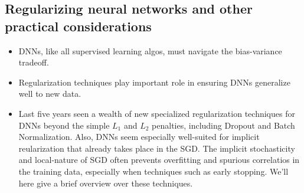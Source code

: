 \documentclass[norsk,a4paper,11pt]{article}
\begin{document}
\subsection{Regularizing neural networks and other practical considerations}
\begin{itemize}
	\item DNNs, like all supervised learning algos, must navigate the bias-variance tradeoff.
	\item Regularization techniques play important role in ensuring DNNs generalize well to new data.
	\item Last five years seen a wealth of new specialized regularization techniques for DNNs beyond the simple $L_1$ and $L_2$ penalties, including Dropout and Batch Normalization. Also, DNNs seem especially well-suited for implicit reularization that already takes place in the SGD. The implicit stochasticity and local-nature of SGD often prevents overfitting and spurious correlatios in the training data, especially when techniques such as early stopping. We'll here give a brief overview over these techniques.
\end{itemize}
\end{document}
